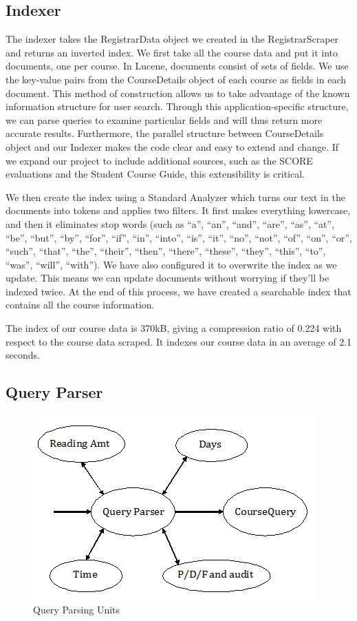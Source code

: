\documentclass[12pt,letterpaper]{article}
\begin{document}
\subsection{Indexer}
	
The indexer takes the RegistrarData object we created in the RegistrarScraper and returns an inverted index. We first take all the course data and put it into documents, one per course. In Lucene, documents consist of sets of fields. We use the key-value pairs from the CourseDetails object of each course as fields in each document. This method of construction allows us to take advantage of the known information structure for user search. Through this application-specific structure, we can parse queries to examine particular fields and will thus return more accurate results. Furthermore, the parallel structure between CourseDetails object and our Indexer makes the code clear and easy to extend and change. If we expand our project to include additional sources, such as the SCORE evaluations and the Student Course Guide, this extensibility is critical. 

We then create the index using a Standard Analyzer which turns our text in the documents into tokens and applies two filters. It first makes everything lowercase, and then it eliminates stop words (such as ``a'', ``an'',  ``and'', ``are'', ``as'', ``at'', ``be'', ``but'', ``by'', ``for'', ``if'', ``in'', ``into'', ``is'', ``it'', ``no'', ``not'', ``of'', ``on'', ``or'', ``such'', ``that'', ``the'', ``their'', ``then'', ``there'', ``these'', ``they'', ``this'', ``to'', ``was'', ``will'', ``with''). We have also configured it to overwrite the index as we update. This means we can update documents without worrying if they'll be indexed twice. At the end of this process, we have created a searchable index that contains all the course information. 

The index of our course data is 370kB, giving a compression ratio of 0.224 with respect to the course data scraped. It indexes our course data in an average of 2.1 seconds. 
	
\subsection{Query Parser}

\begin{figure}
\begin{center}
\includegraphics{QueryParserDiagram.png}
\end{center}
\caption{Query Parsing Units}
\end{figure}
	
\end{document}
